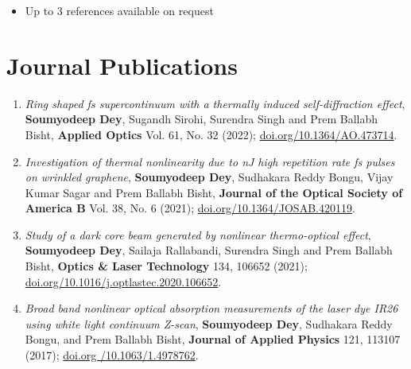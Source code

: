 \documentclass[11pt,a4paper,sans]{moderncv}        %
\begin{document}
\begin{itemize}
	
	\item{Up to 3 references available on request}
	
\end{itemize}

\section{Journal Publications}
\begin{enumerate}
	\item{\emph{Ring shaped fs supercontinuum with a thermally induced self-diffraction effect}, \textbf{Soumyodeep Dey}, Sugandh Sirohi, Surendra Singh and Prem Ballabh Bisht, \textbf{Applied Optics} Vol. 61, No. 32 (2022); \href{doi.org/10.1364/AO.473714}{\color{blue}doi.org/10.1364/AO.473714}.}
		
	\vspace{6pt}
		
	\item{\emph{Investigation of thermal nonlinearity due to nJ high repetition rate fs pulses on wrinkled graphene}, \textbf{Soumyodeep Dey}, Sudhakara Reddy Bongu, Vijay Kumar Sagar and Prem Ballabh Bisht, \textbf{Journal of the Optical Society of America B} Vol. 38, No. 6 (2021); \href{doi.org/10.1364/JOSAB.420119}{\color{blue}doi.org/10.1364/JOSAB.420119}.}
	
	\vspace{6pt}
	
	\item{\emph{Study of a dark core beam generated by nonlinear thermo-optical effect}, \textbf{Soumyodeep Dey}, Sailaja Rallabandi, Surendra Singh and Prem Ballabh Bisht, \textbf{Optics \& Laser Technology} 134, 106652 (2021); \href{doi.org/10.1016/j.optlastec.2020.106652}{\color{blue}doi.org/10.1016/j.optlastec.2020.106652}.}
	
	\vspace{6pt}
	
	\item{\emph{Broad band nonlinear optical absorption measurements of the laser dye IR26 using white light continuum Z-scan}, \textbf{Soumyodeep Dey}, Sudhakara Reddy Bongu, and Prem Ballabh Bisht, \textbf{Journal of Applied Physics} 121, 113107 (2017); \href{doi.org /10.1063/1.4978762}{\color{blue}doi.org /10.1063/1.4978762}.}
	
	\vspace{6pt}
	

\end{enumerate}
\end{document}
